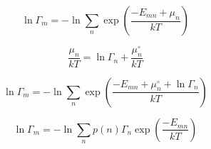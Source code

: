 \documentclass[3p]{elsarticle}
\begin{document}
\begin{equation}
\ln\Gamma_m = -
\ln\displaystyle\sum_n\exp\left(\displaystyle\frac{-E_{mn}+\mu_n}{kT}\right)
\end{equation}

\begin{equation}
\frac{\mu_n}{kT} = \ln\Gamma_n + \frac{\mu_n^{\circ}}{kT}
\end{equation}

\begin{equation}
\ln\Gamma_m = -
\ln\displaystyle\sum_n\exp\left(\displaystyle\frac{-E_{mn}+\mu_n^{\circ}+\ln\Gamma_n}{kT}\right)
\end{equation}

\begin{equation}
\ln\Gamma_m = -
\ln\displaystyle\sum_np(n)\Gamma_n\exp\left(\displaystyle\frac{-E_{mn}}{kT}\right)
\end{equation}


\end{document}
